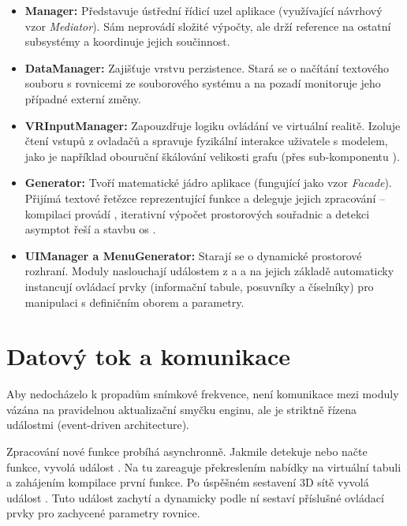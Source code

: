 \documentclass[czech, kiv, sem, he, iso690alph, pdf,viewonly]{fasthesis}
\begin{document}
\begin{itemize}
    \item \textbf{Manager:} Představuje ústřední řídicí uzel aplikace (využívající návrhový vzor \textit{Mediator}). 
    Sám neprovádí složité výpočty, ale drží reference na ostatní subsystémy a koordinuje jejich součinnost.
    \item \textbf{DataManager:} Zajišťuje vrstvu perzistence. 
    Stará se o načítání textového souboru s rovnicemi ze souborového systému a na pozadí monitoruje jeho případné externí změny.
    \item \textbf{VRInputManager:} Zapouzdřuje logiku ovládání ve virtuální realitě. Izoluje čtení vstupů z ovladačů a spravuje fyzikální interakce uživatele s modelem, jako je například obouruční škálování velikosti grafu (přes sub-komponentu ).
    \item \textbf{Generator:} Tvoří matematické jádro aplikace (fungující jako vzor \textit{Facade}). 
    Přijímá textové řetězce reprezentující funkce a deleguje jejich zpracování -- kompilaci provádí , iterativní výpočet prostorových souřadnic a detekci asymptot řeší 
     a stavbu os .
    \item \textbf{UIManager a MenuGenerator:} Starají se o dynamické prostorové rozhraní. 
    Moduly naslouchají událostem z  a  a na jejich základě automaticky instancují ovládací prvky (informační tabule, posuvníky a číselníky) 
    pro manipulaci s definičním oborem a parametry.
\end{itemize}

\section{Datový tok a komunikace}
Aby nedocházelo k propadům snímkové frekvence, není komunikace mezi moduly vázána na pravidelnou aktualizační smyčku enginu, ale je striktně řízena událostmi (event-driven architecture). 

Zpracování nové funkce probíhá asynchronně. 
Jakmile  detekuje nebo načte funkce, vyvolá událost . 
Na tu zareaguje  překreslením nabídky na virtuální tabuli a  zahájením kompilace první funkce. 
Po úspěšném sestavení 3D sítě vyvolá  událost . Tuto událost zachytí  a 
dynamicky podle ní sestaví příslušné ovládací prvky pro zachycené parametry rovnice.
\end{document}
